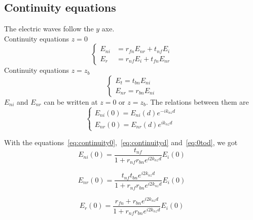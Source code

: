 \subsection{Continuity equations} 
The electric waves follow the $y$ axe.\\
Continuity equations $z=0$
\begin{equation}
\left\lbrace
\begin{array}{ccc}\label{eq:continuity0}
E_{ni}&=r_{fn}E_{nr}+t_{nf}E_i\\
E_r&=r_{nf}E_{i}+t_{fn}E_{nr}
\end{array}\right.
\end{equation}
Continuity equations $z=z_b$
\begin{equation}
\left\lbrace
\begin{array}{ccc}\label{eq:continuityd}
E_t=t_{bn}E_{ni}\\
E_{nr}=r_{bn}E_{ni}
\end{array}\right.
\end{equation}
$E_{ni}$ and $E_{nr}$ can be written at $z=0$ or $z=z_b$. The relations between them are
\begin{equation}
\left\lbrace
\begin{array}{ccc}\label{eq:0tod}
E_{ni}(0)=E_{ni}(d)e^{-ik_{nz}d}\\
E_{nr}(0)=E_{nr}(d)e^{ik_{nz}d}
\end{array}\right.
\end{equation}

With the equations~\eqref{eq:continuity0},~\eqref{eq:continuityd} and~\eqref{eq:0tod}, we got\\
\begin{equation}
E_{ni}(0)=\frac{t_{nf}}{1+r_{nf}r_{bn}e^{i2k_{nz}d}}E_i(0)
\end{equation}

\begin{equation}
E_{nr}(0)=\frac{t_{nf}t_{bn}e^{i2k_{nz}d}}{1+r_{nf}r_{bn}e^{i2k_{nz}d}}E_i(0)
\end{equation}

\begin{equation}\label{eq:reflectivewave}
E_{r}(0)=\frac{r_{fn}+r_{bn}e^{i2k_{nz}d}}{1+r_{nf}r_{bn}e^{i2k_{nz}d}}E_i(0)
\end{equation}

